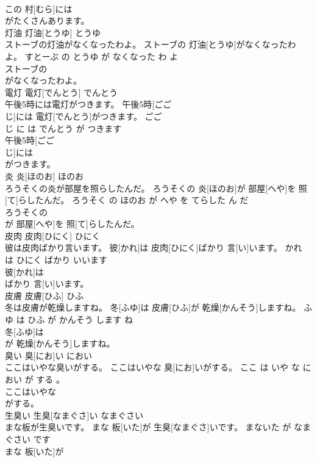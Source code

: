 \documentclass[8pt]{extreport}
\begin{document}
\begin{CJK}{UTF8}{min}
\\	この 村[むら]には
\\	がたくさんあります。			
\\	灯油	灯油[とうゆ]	とうゆ	
\\	ストーブの灯油がなくなったわよ。	ストーブの 灯油[とうゆ]がなくなったわよ。	すとーぶ の とうゆ が なくなった わ よ	
\\	ストーブの
\\	がなくなったわよ。			
\\	電灯	電灯[でんとう]	でんとう	
\\	午後5時には電灯がつきます。	午後5時[ごご 
\\	じ]には 電灯[でんとう]がつきます。	ごご 
\\	じ に は でんとう が つきます	
\\	午後5時[ごご 
\\	じ]には
\\	がつきます。			
\\	炎	炎[ほのお]	ほのお	
\\	ろうそくの炎が部屋を照らしたんだ。	ろうそくの 炎[ほのお]が 部屋[へや]を 照[て]らしたんだ。	ろうそく の ほのお が へや を てらした ん だ	
\\	ろうそくの
\\	が 部屋[へや]を 照[て]らしたんだ。			
\\	皮肉	皮肉[ひにく]	ひにく	
\\	彼は皮肉ばかり言います。	彼[かれ]は 皮肉[ひにく]ばかり 言[い]います。	かれ は ひにく ばかり いいます	
\\	彼[かれ]は
\\	ばかり 言[い]います。			
\\	皮膚	皮膚[ひふ]	ひふ	
\\	冬は皮膚が乾燥しますね。	冬[ふゆ]は 皮膚[ひふ]が 乾燥[かんそう]しますね。	ふゆ は ひふ が かんそう します ね	
\\	冬[ふゆ]は
\\	が 乾燥[かんそう]しますね。			
\\	臭い	臭[にお]い	におい	
\\	ここはいやな臭いがする。	ここはいやな 臭[にお]いがする。	ここ は いや な におい が する 。	
\\	ここはいやな
\\	がする。			
\\	生臭い	生臭[なまぐさ]い	なまぐさい	
\\	まな板が生臭いです。	まな 板[いた]が 生臭[なまぐさ]いです。	まないた が なまぐさい です	
\\	まな 板[いた]が

\end{CJK}
\end{document}
